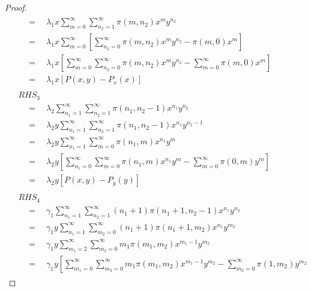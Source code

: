 \begin{proof}
\begin{align}
\begin{split}
            & \quad = \quad \lambda_1 x \sum_{m=0}^{\infty} \sum_{n_2=1}^{\infty} \pi(m, n_2) x^{m} y^{n_2} \\
            & \quad = \quad \lambda_1 x \sum_{m=0}^{\infty} \left[
                \sum_{n_2=0}^{\infty} \pi(m, n_2) x^{m} y^{n_2} - \pi(m, 0) x^m
            \right] \\
            & \quad = \quad \lambda_1 x \left[
                \sum_{m=0}^{\infty} \sum_{n_2=0}^{\infty} \pi(m, n_2) x^{m} y^{n_2}
                - \sum_{m=0}^{\infty} \pi(m, 0) x^m
            \right] \\
            & \quad = \quad \lambda_1 x \left[ P(x,y) - P_x(x) \right]
        \end{split} \\
        \begin{split}
            & RHS_3 \\
            & \quad = \quad \lambda_2 \sum_{n_1=1}^{\infty} \sum_{n_2=1}^{\infty} \pi(n_1, n_2-1) x^{n_1} y^{n_2} \\
            & \quad = \quad \lambda_2 y \sum_{n_1=1}^{\infty} \sum_{n_2=1}^{\infty} \pi(n_1, n_2-1) x^{n_1} y^{n_2-1} \\
            & \quad = \quad \lambda_2 y \sum_{n_1=1}^{\infty} \sum_{m=0}^{\infty} \pi(n_1, m) x^{n_1} y^{m} \\
            & \quad = \quad \lambda_2 y \left[
                \sum_{n_1=0}^{\infty} \sum_{m=0}^{\infty} \pi(n_1, m) x^{n_1} y^{m} - \sum_{m=0}^{\infty} \pi(0, m) y^m
            \right] \\
            & \quad = \quad \lambda_2 y \left[ P(x,y) - P_y(y) \right]
        \end{split} \\
        \begin{split}
            & RHS_4 \\
            & \quad = \quad \gamma_1 \sum_{n_1=1}^{\infty} \sum_{n_2=1}^{\infty} (n_1+1) \pi(n_1+1, n_2-1) x^{n_1} y^{n_2} \\
            & \quad = \quad \gamma_1 y \sum_{n_1=1}^{\infty} \sum_{m_2=0}^{\infty} (n_1+1) \pi(n_1+1, m_2) x^{n_1} y^{m_2} \\
            & \quad = \quad \gamma_1 y \sum_{m_1=2}^{\infty} \sum_{m_2=0}^{\infty} m_1 \pi(m_1, m_2) x^{m_1-1} y^{m_2} \\
            & \quad = \quad \gamma_1 y \left[
                \sum_{m_1=0}^{\infty} \sum_{m_2=0}^{\infty} m_1 \pi(m_1, m_2) x^{m_1-1} y^{m_2}
                - \sum_{m_2=0}^{\infty} \pi(1, m_2) y^{m_2}

\end{split}
\end{align}
\end{proof}
